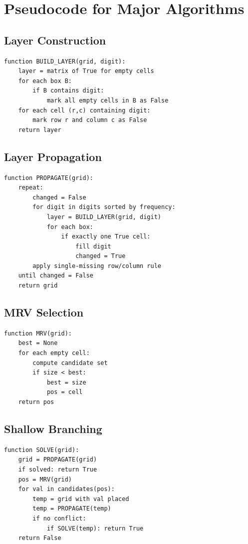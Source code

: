 \documentclass[11pt]{article}
\begin{document}
\section{Pseudocode for Major Algorithms}

\subsection{Layer Construction}
\begin{verbatim}
function BUILD_LAYER(grid, digit):
    layer = matrix of True for empty cells
    for each box B:
        if B contains digit:
            mark all empty cells in B as False
    for each cell (r,c) containing digit:
        mark row r and column c as False
    return layer
\end{verbatim}

\subsection{Layer Propagation}
\begin{verbatim}
function PROPAGATE(grid):
    repeat:
        changed = False
        for digit in digits sorted by frequency:
            layer = BUILD_LAYER(grid, digit)
            for each box:
                if exactly one True cell:
                    fill digit
                    changed = True
        apply single-missing row/column rule
    until changed = False
    return grid
\end{verbatim}

\subsection{MRV Selection}
\begin{verbatim}
function MRV(grid):
    best = None
    for each empty cell:
        compute candidate set
        if size < best:
            best = size
            pos = cell
    return pos
\end{verbatim}

\subsection{Shallow Branching}
\begin{verbatim}
function SOLVE(grid):
    grid = PROPAGATE(grid)
    if solved: return True
    pos = MRV(grid)
    for val in candidates(pos):
        temp = grid with val placed
        temp = PROPAGATE(temp)
        if no conflict:
            if SOLVE(temp): return True
    return False
\end{verbatim}
\end{document}

